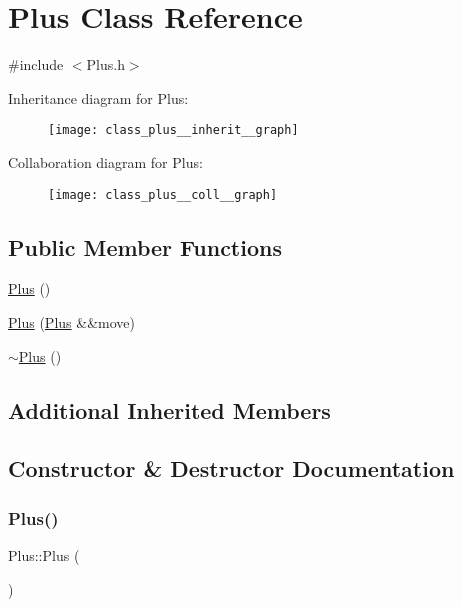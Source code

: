 \hypertarget{class_plus}{}\section{Plus Class Reference}
\label{class_plus}


{\ttfamily \#include $<$Plus.\+h$>$}



Inheritance diagram for Plus\+:
\nopagebreak
\begin{figure}[H]
\begin{center}
\leavevmode
\texttt{[image: class\_plus\_\_inherit\_\_graph]}
\end{center}
\end{figure}


Collaboration diagram for Plus\+:
\nopagebreak
\begin{figure}[H]
\begin{center}
\leavevmode
\texttt{[image: class\_plus\_\_coll\_\_graph]}
\end{center}
\end{figure}
\subsection*{Public Member Functions}
\begin{DoxyCompactItemize}
\item 
\mbox{\hyperlink{class_plus_a29a030d2c69d4f7b59bce14f6303db8f}{Plus}} ()
\item 
\mbox{\hyperlink{class_plus_ad3b8464eb21864e4f8a29f5fab7f9656}{Plus}} (\mbox{\hyperlink{class_plus}{Plus}} \&\&move)
\item 
\mbox{\hyperlink{class_plus_a8d2722ae57cd3ed3b8617c23499ac4c0}{$\sim$\+Plus}} ()
\end{DoxyCompactItemize}
\subsection*{Additional Inherited Members}


\subsection{Constructor \& Destructor Documentation}
\mbox{\label{class_plus_a29a030d2c69d4f7b59bce14f6303db8f}} 
\subsubsection{\texorpdfstring{Plus()}{Plus()}\hspace{0.1cm}{\footnotesize\ttfamily [1/2]}}
{\footnotesize\ttfamily Plus\+::\+Plus (\begin{DoxyParamCaption}{ }\end{DoxyParamCaption})}


